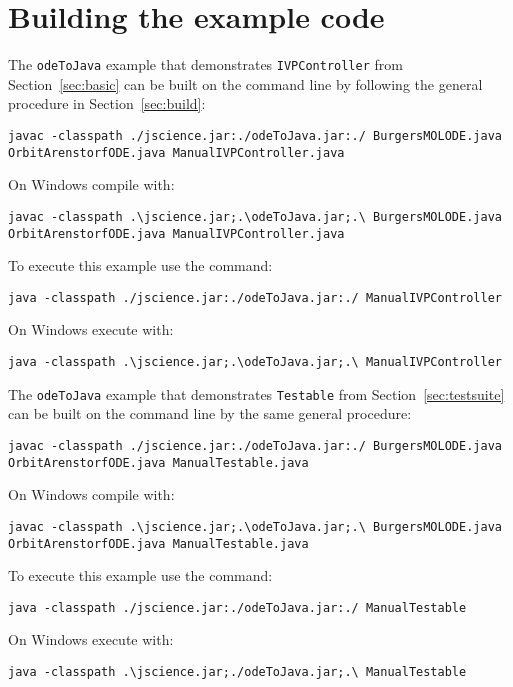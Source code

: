 \documentclass[10pt,letterpaper]{article}
\newcommand\odj{{\tt odeToJava}}
\newcommand\ivpcont{{\tt IVPController}}
\newcommand\tstble{{\tt Testable}}
\begin{document}
\section{Building the example code}

The \odj{} example that demonstrates \ivpcont{} from Section~\ref{sec:basic} can
be built on the command line by following the general procedure in
Section~\ref{sec:build}:
{\scriptsize
\begin{verbatim}
javac -classpath ./jscience.jar:./odeToJava.jar:./ BurgersMOLODE.java OrbitArenstorfODE.java ManualIVPController.java
\end{verbatim}
}
On Windows compile with:
{\scriptsize
\begin{verbatim}
javac -classpath .\jscience.jar;.\odeToJava.jar;.\ BurgersMOLODE.java OrbitArenstorfODE.java ManualIVPController.java
\end{verbatim} 
}
To execute this example use the command:
{\scriptsize
\begin{verbatim}
java -classpath ./jscience.jar:./odeToJava.jar:./ ManualIVPController
\end{verbatim}
}
On Windows execute with:
{\scriptsize
\begin{verbatim}
java -classpath .\jscience.jar;.\odeToJava.jar;.\ ManualIVPController
\end{verbatim} 
}

The \odj{} example that demonstrates \tstble{} from Section~\ref{sec:testsuite}
can be built on the command line by the same general procedure:
{\scriptsize
\begin{verbatim}
javac -classpath ./jscience.jar:./odeToJava.jar:./ BurgersMOLODE.java OrbitArenstorfODE.java ManualTestable.java
\end{verbatim}
}
On Windows compile with:
{\scriptsize
\begin{verbatim}
javac -classpath .\jscience.jar;.\odeToJava.jar;.\ BurgersMOLODE.java OrbitArenstorfODE.java ManualTestable.java
\end{verbatim} 
}
To execute this example use the command:
{\scriptsize
\begin{verbatim}
java -classpath ./jscience.jar:./odeToJava.jar:./ ManualTestable
\end{verbatim} 
}
On Windows execute with:
{\scriptsize
\begin{verbatim}
java -classpath .\jscience.jar;./odeToJava.jar;.\ ManualTestable
\end{verbatim}  
}
\end{document}
